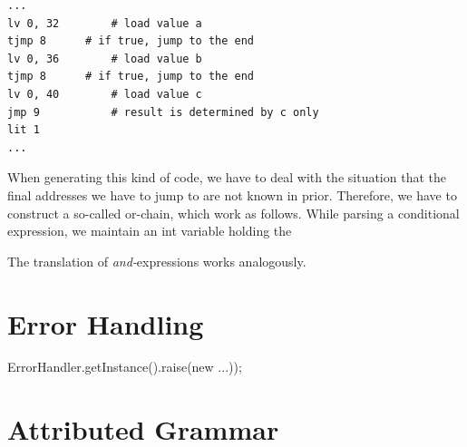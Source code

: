 \documentclass[11pt]{report}
\newcommand{\leongage}{NoBeard}
\newcommand{\alternative}{$\mid \;$}
\newenvironment{atg}[1][6cm]
	{\begin{tabular}[b]{lclp{#1}}}
	{\end{tabular}}
\newcommand{\atgsy}[2]{$\textrm{#1}_\textrm{#2}$}
\newcommand{\outattr}{$\uparrow$}
\newcommand{\inattr}{$\downarrow$}
\newcommand{\semantics}[1]{\textcolor{Gray}{#1}}
\newenvironment {sem}
	{\underline{sem}}
	{\underline{endsem}}
\begin{document}

\begin{lstlisting}[float,caption={Assembler code of or-chain}, captionpos=b,label=cod:orchain]
...
lv 0, 32		# load value a
tjmp 8		# if true, jump to the end
lv 0, 36		# load value b
tjmp 8		# if true, jump to the end
lv 0, 40		# load value c
jmp 9			# result is determined by c only
lit 1
...
\end{lstlisting}
When generating this kind of code, we have to deal with the situation that the final addresses we have to jump to are not known in prior. Therefore, we have to construct a so-called or-chain, which work as follows. While parsing a conditional expression, we maintain an int variable holding the 

The translation of {\em and-}expressions works analogously.


\chapter{Error Handling}
ErrorHandler.getInstance().raise(new ...));

\chapter{Attributed Grammar}
%
%
\end{document}

